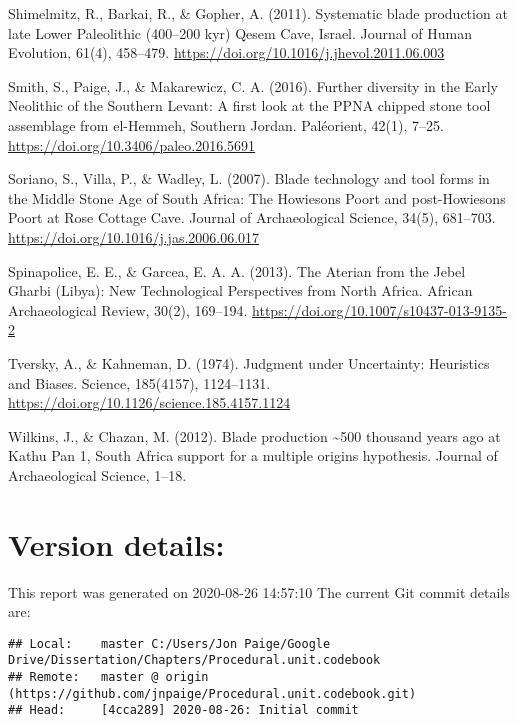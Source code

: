 \documentclass[
]{article}
\begin{document}
Shimelmitz, R., Barkai, R., \& Gopher, A. (2011). Systematic blade
production at late Lower Paleolithic (400--200 kyr) Qesem Cave, Israel.
Journal of Human Evolution, 61(4), 458--479.
\url{https://doi.org/10.1016/j.jhevol.2011.06.003}

Smith, S., Paige, J., \& Makarewicz, C. A. (2016). Further diversity in
the Early Neolithic of the Southern Levant: A first look at the PPNA
chipped stone tool assemblage from el-Hemmeh, Southern Jordan.
Paléorient, 42(1), 7--25. \url{https://doi.org/10.3406/paleo.2016.5691}

Soriano, S., Villa, P., \& Wadley, L. (2007). Blade technology and tool
forms in the Middle Stone Age of South Africa: The Howiesons Poort and
post-Howiesons Poort at Rose Cottage Cave. Journal of Archaeological
Science, 34(5), 681--703.
\url{https://doi.org/10.1016/j.jas.2006.06.017}

Spinapolice, E. E., \& Garcea, E. A. A. (2013). The Aterian from the
Jebel Gharbi (Libya): New Technological Perspectives from North Africa.
African Archaeological Review, 30(2), 169--194.
\url{https://doi.org/10.1007/s10437-013-9135-2}

Tversky, A., \& Kahneman, D. (1974). Judgment under Uncertainty:
Heuristics and Biases. Science, 185(4157), 1124--1131.
\url{https://doi.org/10.1126/science.185.4157.1124}

Wilkins, J., \& Chazan, M. (2012). Blade production \textasciitilde500
thousand years ago at Kathu Pan 1, South Africa support for a multiple
origins hypothesis. Journal of Archaeological Science, 1--18.

\hypertarget{version-details}{%
\section{Version details:}\label{version-details}}

This report was generated on 2020-08-26 14:57:10 The current Git commit
details are:

\begin{verbatim}
## Local:    master C:/Users/Jon Paige/Google Drive/Dissertation/Chapters/Procedural.unit.codebook
## Remote:   master @ origin (https://github.com/jnpaige/Procedural.unit.codebook.git)
## Head:     [4cca289] 2020-08-26: Initial commit
\end{verbatim}
\end{document}
